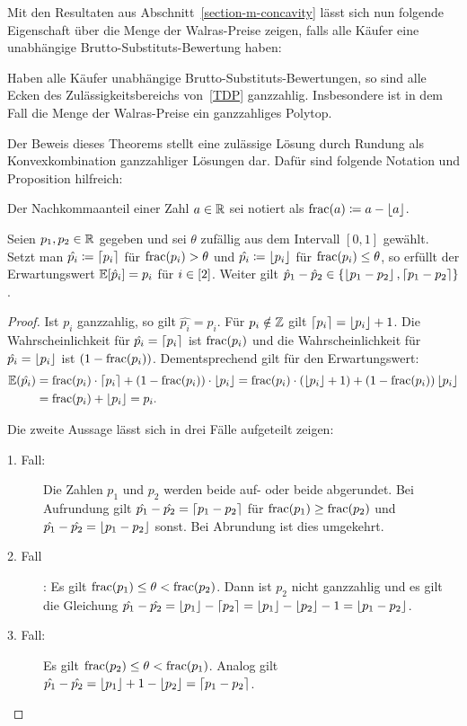 Mit den Resultaten aus Abschnitt~\ref{section-m-concavity} lässt sich nun folgende Eigenschaft über die Menge der Walras-Preise zeigen, falls alle Käufer eine unabhängige Brutto-Substituts-Bewertung haben:

\begin{theorem}\label{thm-walras-prices-integral-polytope}
	Haben alle Käufer unabhängige Brutto-Substituts-Bewertungen, so sind alle Ecken des Zulässigkeitsbereichs von~\eqref{TDP} ganzzahlig.
	Insbesondere ist in dem Fall die Menge der Walras-Preise ein ganzzahliges Polytop.
\end{theorem}
Der Beweis dieses Theorems stellt eine zulässige Lösung durch Rundung als Konvexkombination ganzzahliger Lösungen dar.
Dafür sind folgende Notation und Proposition hilfreich:
\begin{notation}
	Der Nachkommaanteil einer Zahl $a\in\mathbb{R}$ sei notiert als $\operatorname{frac}(a)\coloneqq a - \left\lfloor a \right\rfloor$.
\end{notation}
\begin{proposition}\label{prop-integral-polytop-helper}
	Seien $p_1,p_2\in\mathbb{R}$ gegeben und sei $\theta$ zufällig aus dem Intervall $[0,1]$ gewählt.
	Setzt man $\hat{p_i}\coloneqq \left\lceil p_i \right\rceil$ für $\operatorname{frac}(p_i)> \theta$ und $\hat{p_i}\coloneqq \left\lfloor p_i \right\rfloor$ für $\operatorname{frac}(p_i) \leq \theta$, so erfüllt der Erwartungswert $\mathbb{E}[\hat{p}_i] = p_i$ für $i\in\left[ 2 \right]$. Weiter gilt $\hat{p}_1 - \hat{p}_2 \in \{ \left\lfloor p_1 - p_2 \right\rfloor, \left\lceil p_1 - p_2 \right\rceil \}$.
\end{proposition}
\begin{proof}
	Ist $p_i$ ganzzahlig, so gilt $\hat{p_i} = p_i$.
	Für $p_i\notin\mathbb{Z}$ gilt $\left\lceil p_i \right\rceil = \left\lfloor p_i \right\rfloor + 1$.
	Die Wahrscheinlichkeit für $\hat{p_i} = \left\lceil p_i \right\rceil$ ist $\operatorname{frac}(p_i)$ und die Wahrscheinlichkeit für $\hat{p_i} = \left\lfloor p_i \right\rfloor$ ist $(1-\operatorname{frac}(p_i))$.
	Dementsprechend gilt für den Erwartungswert: \begin{align*}
	\mathbb{E}(\hat{p_i})
	&= \operatorname{frac}(p_i) \cdot \left\lceil p_i \right\rceil + (1-\operatorname{frac}(p_i))\cdot \left\lfloor p_i \right\rfloor
	= \operatorname{frac}(p_i)\cdot (\left\lfloor p_i \right\rfloor + 1) + (1-\operatorname{frac}(p_i)) \left\lfloor p_i \right\rfloor \\
	&= \operatorname{frac}(p_i) + \left\lfloor p_i \right\rfloor = p_i.
	\end{align*}
	
	Die zweite Aussage lässt sich in drei Fälle aufgeteilt zeigen:
	\begin{description}
		\item[1. Fall:] Die Zahlen $p_1$ und $p_2$ werden beide auf- oder beide abgerundet.
		Bei Aufrundung gilt $\hat{p_1} - \hat{p_2} = \left\lceil p_1 - p_2 \right\rceil$ für $\operatorname{frac}(p_1) \geq \operatorname{frac}(p_2)$ und $\hat{p_1} - \hat{p_2} = \left\lfloor p_1 - p_2 \right\rfloor$ sonst.
		Bei Abrundung ist dies umgekehrt.
		\item[2. Fall]: Es gilt $\operatorname{frac}(p_1) \leq \theta < \operatorname{frac}(p_2)$.
		Dann ist $p_2$ nicht ganzzahlig und es gilt die Gleichung $\hat{p_1} - \hat{p_2} = \left\lfloor p_1 \right\rfloor - \left\lceil p_2 \right\rceil = \left\lfloor p_1 \right\rfloor - \left\lfloor p_2 \right\rfloor - 1 = \left\lfloor p_1 - p_2 \right\rfloor$.
		\item[3. Fall:] Es gilt $\operatorname{frac}(p_2) \leq \theta < \operatorname{frac}(p_1)$. Analog gilt $\hat{p_1} - \hat{p_2} = \left\lfloor p_1 \right\rfloor + 1 - \left\lfloor p_2 \right\rfloor = \left\lceil p_1 - p_2 \right\rceil$.
	\end{description}
	\vspace{-0.5em}
\end{proof}
